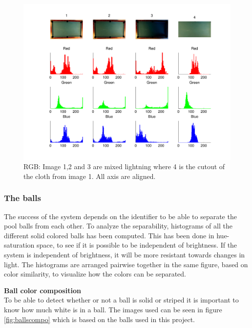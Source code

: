 \begin{figure}[H]
\begin{center}
\leavevmode
\includegraphics[width=1\textwidth]{images/rgb_hist_table}
\end{center}
\caption{RGB: Image 1,2 and 3 are mixed lightning where 4 is the cutout of the cloth from image 1. All axis are aligned.}
\label{fig:tablergb}
\end{figure}

\subsubsection{The balls}
The success of the system depends on the identifier to be able to separate the pool balls from each other. To analyze the separability, histograms of all the different solid colored balls has been computed. This has been done in hue-saturation space, to see if it is possible to be independent of brightness. If the system is independent of brightness, it will be more resistant towards changes in light. The histograms are arranged pairwise together in the same figure, based on color similarity, to visualize how the colors can be separated.



\textbf{Ball color composition}\\
To be able to detect whether or not a ball is solid or striped it is important to know how much white is in a ball. The images used can be seen in figure \ref{fig:ballscompo} which is based on the balls used in this project.

